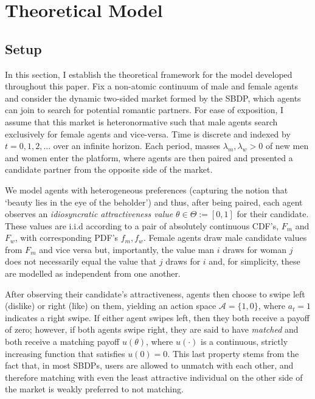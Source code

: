 \section{Theoretical Model}
\label{sec:section2}
\subsection{Setup}\label{sec:section2.1} 
In this section, I establish the theoretical framework for the model developed throughout this paper. Fix a non-atomic continuum of male and female agents and consider the dynamic two-sided market formed by the SBDP, which agents can join to search for potential romantic partners. 
For ease of exposition, I assume that this market is heteronormative such that male agents search exclusively for female agents and vice-versa. 
Time is discrete and indexed by $t=0, 1, 2, ...$ over an infinite horizon. Each period, masses $\lambda_m, \lambda_w>0$ of new men and women enter the platform, where agents are then paired and presented a candidate partner from the opposite side of the market. 

We model agents with heterogeneous preferences (capturing the notion that `beauty lies in the eye of the beholder') and thus, after being paired, each agent observes an \textit{idiosyncratic attractiveness value} $\theta \in \Theta := [0,1]$ for their candidate. 
These values are i.i.d according to a pair of absolutely continuous CDF's, $F_m$ and $F_w$, with corresponding PDF's $f_m,f_w$. 
Female agents draw male candidate values from $F_m$ and vice versa but, importantly, the value man $i$ draws for woman $j$ does not necessarily equal the value that $j$ draws for $i$ and, for simplicity, these are modelled as independent from one another.

After observing their candidate's attractiveness, agents then choose to swipe left (dislike) or right (like) on them, yielding an action space $\mathcal{A}=\{ 1, 0\}$, where $a_t=1$ indicates a right swipe. 
If either agent swipes left, then they both receive a payoff of zero; however, if both agents swipe right, they are said to have \textit{matched} and both receive a matching payoff $u(\theta)$, where $u(\cdot)$ is a continuous, strictly increasing function that satisfies $u(0) = 0$. 
This last property stems from the fact that, in most SBDPs, users are allowed to unmatch with each other, and therefore matching with even the least attractive individual on the other side of the market is weakly preferred to not matching. 

